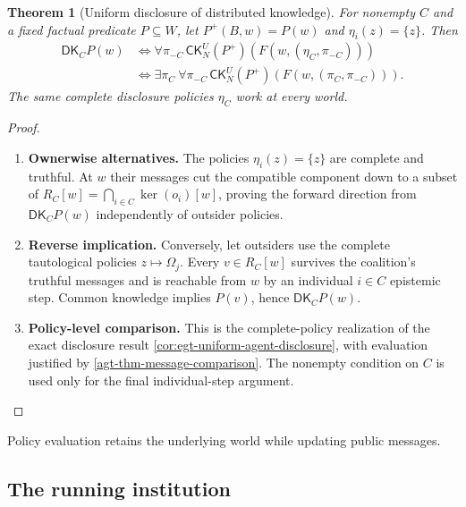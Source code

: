 \documentclass[11pt,a4paper]{article}
\numberwithin{equation}{section}
\newtheorem{theorem}{Theorem}[section]
\theoremstyle{definition}
\theoremstyle{remark}
\theoremstyle{plain}
\providecommand{\DK}{\mathsf{DK}}
\providecommand{\CK}{\mathsf{CK}}
\begin{document}
\begin{theorem}[Uniform disclosure of distributed knowledge]
\label{agt-thm-disclosure}
For nonempty $C$ and a fixed factual predicate $P\subseteq W$, let
$P^+(B,w)=P(w)$ and $\eta_i(z)=\{z\}$. Then
\begin{align*}
 \DK_CP(w)
 &\iff\forall\pi_{-C}\,
       \CK_N^U(P^+)(F(w,(\eta_C,\pi_{-C})))\\
 &\iff\exists\pi_C\ \forall\pi_{-C}\,
       \CK_N^U(P^+)(F(w,(\pi_C,\pi_{-C}))).
\end{align*}
The same complete disclosure policies $\eta_C$ work at every world.
\end{theorem}
\begin{proof}
\leavevmode
\begin{enumerate}[label=\textup{(\arabic*)},leftmargin=*,itemsep=4pt,topsep=3pt]
  \item \textbf{Ownerwise alternatives.} The policies $\eta_i(z)=\{z\}$ are complete and truthful. At $w$ their
messages cut the compatible component down to a subset of
$R_C[w]=\bigcap_{i\in C}\ker(o_i)[w]$, proving the forward direction
from $\DK_CP(w)$ independently of outsider policies.
  \item \textbf{Reverse implication.} Conversely, let outsiders use the complete tautological policies
$z\mapsto\Omega_j$. Every $v\in R_C[w]$ survives the coalition's
truthful messages and is reachable from $w$ by an individual $i\in C$
epistemic step. Common knowledge implies $P(v)$, hence $\DK_CP(w)$.
  \item \textbf{Policy-level comparison.} This is the complete-policy realization of the exact disclosure result
\cref{cor:egt-uniform-agent-disclosure}, with evaluation justified by
\cref{agt-thm-message-comparison}. The nonempty condition on $C$ is
used only for the final individual-step argument.
\end{enumerate}
\end{proof}

\noindent Policy evaluation retains the underlying world while updating public messages.
\begin{center}
\end{center}

\subsection{The running institution}\label{sec:agt-running-institution}
\end{document}
